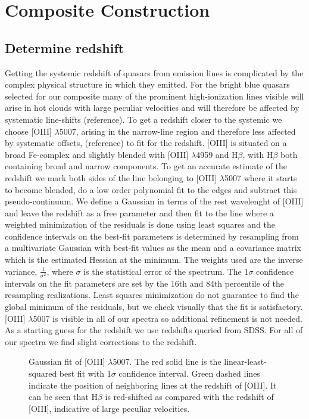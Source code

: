 \documentclass[iop]{emulateapj}
\begin{document}
\section{Composite Construction}

\subsection{Determine redshift}
Getting the systemic redshift of quasars from emission lines is complicated by the complex physical structure in which they emitted. For the bright blue quasars selected for our composite many of the prominent high-ionization lines visible will arise in hot clouds with large peculiar velocities and will therefore be affected by systematic line-shifts (reference). To get a redshift closer to the systemic we choose [OIII] $\lambda$5007,  arising in the narrow-line region and therefore less affected by systematic offsets, (reference) to fit for the redshift. [OIII] is situated on a broad Fe-complex and slightly blended with [OIII] $\lambda$4959 and H$\beta$, with H$\beta$ both containing broad and narrow components. To get an accurate estimate of the redshift we mark both sides of the line belonging to [OIII] $\lambda$5007 where it starts to become blended, do a low order polynomial fit to the edges and subtract this pseudo-continuum. We define a Gaussian in terms of the rest wavelenght of [OIII] and leave the redshift as a free parameter and then fit to the line where a weighted minimization of the residuals is done using least squares and the confidence intervals on the best-fit parameters is determined by resampling from a multivariate Gaussian with best-fit values as the mean and a covariance matrix which is the estimated Hessian at the minimum. The weights used are the inverse variance, $\frac{1}{\sigma^2}$, where $\sigma$ is the statistical error of the spectrum. The 1$\sigma$ confidence intervals on the fit parameters are set by the 16th and 84th percentile of the resampling realizations. Least squares minimization do not guarantee to find the global minimum of the residuals, but we check visually that the fit is satisfactory. [OIII] $\lambda$5007 is visible in all of our spectra so additional refinement is not needed. As a starting guess for the redshift we use redshifts queried from SDSS. For all of our spectra we find slight corrections to the redshift.

\begin{figure}
\caption{Gaussian fit of [OIII] $\lambda$5007. The red solid line is the linear-least-squared best fit with 1$\sigma$ confidence interval. Green dashed lines indicate the position of neighboring lines at the redshift of [OIII]. It can be seen that H$\beta$ is red-shifted as compared with the redshift of [OIII], indicative of large peculiar velocities.\label{linefit}}
\end{figure}
\end{document}
